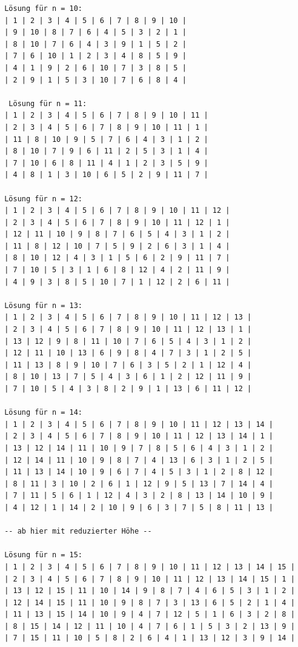\documentclass[a4paper, notitlepage, 12pt]{scrartcl}
\begin{document}
 \begin{center}
 \begin{Verbatim}
 Lösung für n = 10:
 | 1 | 2 | 3 | 4 | 5 | 6 | 7 | 8 | 9 | 10 | 
 | 9 | 10 | 8 | 7 | 6 | 4 | 5 | 3 | 2 | 1 | 
 | 8 | 10 | 7 | 6 | 4 | 3 | 9 | 1 | 5 | 2 | 
 | 7 | 6 | 10 | 1 | 2 | 3 | 4 | 8 | 5 | 9 | 
 | 4 | 1 | 9 | 2 | 6 | 10 | 7 | 3 | 8 | 5 | 
 | 2 | 9 | 1 | 5 | 3 | 10 | 7 | 6 | 8 | 4 | 
 
  Lösung für n = 11:
 | 1 | 2 | 3 | 4 | 5 | 6 | 7 | 8 | 9 | 10 | 11 | 
 | 2 | 3 | 4 | 5 | 6 | 7 | 8 | 9 | 10 | 11 | 1 | 
 | 11 | 8 | 10 | 9 | 5 | 7 | 6 | 4 | 3 | 1 | 2 | 
 | 8 | 10 | 7 | 9 | 6 | 11 | 2 | 5 | 3 | 1 | 4 | 
 | 7 | 10 | 6 | 8 | 11 | 4 | 1 | 2 | 3 | 5 | 9 | 
 | 4 | 8 | 1 | 3 | 10 | 6 | 5 | 2 | 9 | 11 | 7 | 
 
 Lösung für n = 12:
 | 1 | 2 | 3 | 4 | 5 | 6 | 7 | 8 | 9 | 10 | 11 | 12 | 
 | 2 | 3 | 4 | 5 | 6 | 7 | 8 | 9 | 10 | 11 | 12 | 1 | 
 | 12 | 11 | 10 | 9 | 8 | 7 | 6 | 5 | 4 | 3 | 1 | 2 | 
 | 11 | 8 | 12 | 10 | 7 | 5 | 9 | 2 | 6 | 3 | 1 | 4 | 
 | 8 | 10 | 12 | 4 | 3 | 1 | 5 | 6 | 2 | 9 | 11 | 7 | 
 | 7 | 10 | 5 | 3 | 1 | 6 | 8 | 12 | 4 | 2 | 11 | 9 | 
 | 4 | 9 | 3 | 8 | 5 | 10 | 7 | 1 | 12 | 2 | 6 | 11 | 
 
 Lösung für n = 13:
 | 1 | 2 | 3 | 4 | 5 | 6 | 7 | 8 | 9 | 10 | 11 | 12 | 13 | 
 | 2 | 3 | 4 | 5 | 6 | 7 | 8 | 9 | 10 | 11 | 12 | 13 | 1 | 
 | 13 | 12 | 9 | 8 | 11 | 10 | 7 | 6 | 5 | 4 | 3 | 1 | 2 | 
 | 12 | 11 | 10 | 13 | 6 | 9 | 8 | 4 | 7 | 3 | 1 | 2 | 5 | 
 | 11 | 13 | 8 | 9 | 10 | 7 | 6 | 3 | 5 | 2 | 1 | 12 | 4 | 
 | 8 | 10 | 13 | 7 | 5 | 4 | 3 | 6 | 1 | 2 | 12 | 11 | 9 | 
 | 7 | 10 | 5 | 4 | 3 | 8 | 2 | 9 | 1 | 13 | 6 | 11 | 12 | 
 
 Lösung für n = 14:
 | 1 | 2 | 3 | 4 | 5 | 6 | 7 | 8 | 9 | 10 | 11 | 12 | 13 | 14 | 
 | 2 | 3 | 4 | 5 | 6 | 7 | 8 | 9 | 10 | 11 | 12 | 13 | 14 | 1 | 
 | 13 | 12 | 14 | 11 | 10 | 9 | 7 | 8 | 5 | 6 | 4 | 3 | 1 | 2 | 
 | 12 | 14 | 11 | 10 | 9 | 8 | 7 | 4 | 13 | 6 | 3 | 1 | 2 | 5 | 
 | 11 | 13 | 14 | 10 | 9 | 6 | 7 | 4 | 5 | 3 | 1 | 2 | 8 | 12 | 
 | 8 | 11 | 3 | 10 | 2 | 6 | 1 | 12 | 9 | 5 | 13 | 7 | 14 | 4 | 
 | 7 | 11 | 5 | 6 | 1 | 12 | 4 | 3 | 2 | 8 | 13 | 14 | 10 | 9 | 
 | 4 | 12 | 1 | 14 | 2 | 10 | 9 | 6 | 3 | 7 | 5 | 8 | 11 | 13 | 
 
 -- ab hier mit reduzierter Höhe --
 
 Lösung für n = 15: 
 | 1 | 2 | 3 | 4 | 5 | 6 | 7 | 8 | 9 | 10 | 11 | 12 | 13 | 14 | 15 | 
 | 2 | 3 | 4 | 5 | 6 | 7 | 8 | 9 | 10 | 11 | 12 | 13 | 14 | 15 | 1 | 
 | 13 | 12 | 15 | 11 | 10 | 14 | 9 | 8 | 7 | 4 | 6 | 5 | 3 | 1 | 2 | 
 | 12 | 14 | 15 | 11 | 10 | 9 | 8 | 7 | 3 | 13 | 6 | 5 | 2 | 1 | 4 | 
 | 11 | 13 | 15 | 14 | 10 | 9 | 4 | 7 | 12 | 5 | 1 | 6 | 3 | 2 | 8 | 
 | 8 | 15 | 14 | 12 | 11 | 10 | 4 | 7 | 6 | 1 | 5 | 3 | 2 | 13 | 9 | 
 | 7 | 15 | 11 | 10 | 5 | 8 | 2 | 6 | 4 | 1 | 13 | 12 | 3 | 9 | 14 | 
 

\end{Verbatim}
\end{center}
\end{document}
